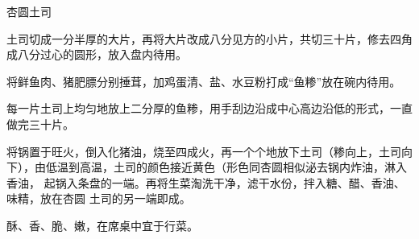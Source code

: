 \begin{recipe}{杏圆土司}

\ingredients


\preparation

\step 土司切成一分半厚的大片，再将大片改成八分见方的小片，共切三十片，修去四角
成八分过心的圆形，放入盘内待用。

\step 将鲜鱼肉、猪肥膘分别捶茸，加鸡蛋清、盐、水豆粉打成“鱼糁”放在碗内待用。

\step 每一片土司上均匀地放上二分厚的鱼糁，用手刮边沿成中心高边沿低的形式，一直
做完三十片。

\step 将锅置于旺火，倒入化猪油，烧至四成火，再一个个地放下土司（糁向上，土司向
下），由低温到高温，土司的颜色接近黄色（形色同杏圆相似泌去锅内炸油，淋入香油，
起锅入条盘的一端。再将生菜淘洗干净，滤干水份，拌入糖、醋、香油、味精，放在杏圆
土司的另一端即成。

\features

酥、香、脆、嫩，在席桌中宜于行菜。

\end{recipe}

